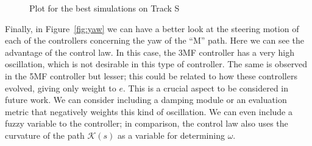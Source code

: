 \documentclass[symmetry,article,submit,moreauthors,pdftex]{Definitions/mdpi}
\begin{document}
\begin{figure}[H]
    \widefigure
     \centering
     \caption{Plot for the best simulations on Track S}
        \label{fig:3RutasS}
\end{figure}
\begin{paracol}{2}
\linenumbers
\switchcolumn


Finally, in Figure~\ref{fig:yaw} we can have a better look at the steering
motion of each of the controllers concerning the yaw of the ``M'' path. Here we
can see the advantage of the control law. In this case, the 3MF controller has
a very high oscillation, which is not desirable in this type of controller. The
same is observed in the 5MF controller but lesser; this could be related to how
these controllers evolved, giving only weight to $e$.  This is a crucial aspect
to be considered in future work. We can consider including a damping module or
an evaluation metric that negatively weights this kind of oscillation. We can
even include a fuzzy variable to the controller; in comparison, the control law
also uses the curvature of the path $\mathcal{K}(s)$ as a variable for
determining $\omega$.

\end{paracol}
\end{document}

